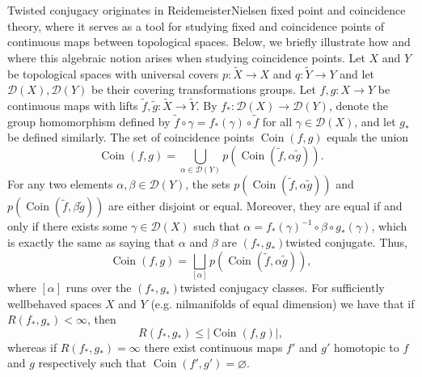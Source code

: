 \documentclass[a4paper,11pt]{report}
\begin{document}
{ Twisted conjugacy originates in Reidemeister\texttt{}Nielsen fixed
point and coincidence theory, where it serves as a tool for studying fixed and
coincidence points of continuous maps between topological spaces. Below, we
briefly illustrate how and where this algebraic notion arises when studying
coincidence points. Let $X$ and $Y$ be topological spaces with universal covers $p \colon \tilde{X} \to X$ and $q \colon \tilde{Y} \to Y$ and let $\mathcal{D}(X), \mathcal{D}(Y)$ be their covering transformations groups. Let $f,g \colon X \to Y$ be continuous maps with lifts $\tilde{f}, \tilde{g} \colon \tilde{X} \to \tilde{Y}$. By $f_*\colon \mathcal{D}(X) \to \mathcal{D}(Y)$, denote the group homomorphism defined by $\tilde{f} \circ \gamma = f_*(\gamma) \circ \tilde{f}$ for all $\gamma \in \mathcal{D}(X)$, and let $g_*$ be defined similarly. The set of coincidence points $\operatorname{Coin}(f,g)$ equals the union 
\[\operatorname{Coin}(f,g) = \bigcup_{\alpha \in \mathcal{D}(Y)}
p(\operatorname{Coin}(\tilde{f}, \alpha \tilde{g})).\]
 For any two elements $\alpha, \beta \in \mathcal{D}(Y)$, the sets $p(\operatorname{Coin}(\tilde{f}, \alpha \tilde{g}))$ and $p(\operatorname{Coin}(\tilde{f}, \beta \tilde{g}))$ are either disjoint or equal. Moreover, they are equal if and only if there
exists some $\gamma \in \mathcal{D}(X)$ such that $\alpha = f_*(\gamma)^{-1} \circ \beta \circ g_*(\gamma)$, which is exactly the same as saying that $\alpha$ and $\beta$ are $(f_*,g_*)$\texttt{}twisted conjugate. Thus, 
\[\operatorname{Coin}(f,g) = \bigsqcup_{[\alpha]}
p(\operatorname{Coin}(\tilde{f}, \alpha \tilde{g})),\]
 where $[\alpha]$ runs over the $(f_*,g_*)$\texttt{}twisted conjugacy classes. For sufficiently
well\texttt{}behaved spaces $X$ and $Y$ (e.g. nilmanifolds of equal dimension) we have that if $R(f_*,g_*) < \infty$, then 
\[R(f_*,g_*) \leq \left|\operatorname{Coin}(f,g)\right|,\]
 whereas if $R(f_*,g_*) = \infty$ there exist continuous maps $f'$ and $g'$ homotopic to $f$ and $g$ respectively such that $\operatorname{Coin}(f',g') = \varnothing$. }

   
\end{document}
